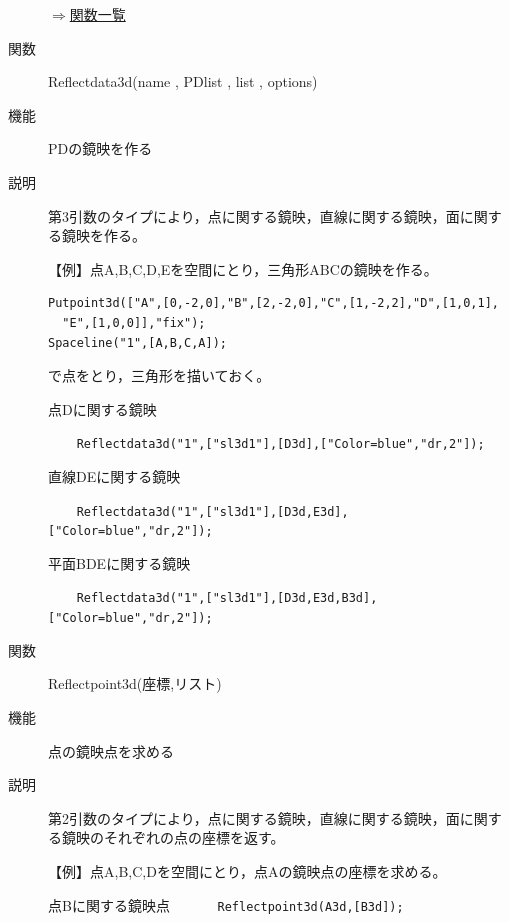 \documentclass[papersize,a4paper,12pt,uplatex]{jsarticle}
\begin{document}
\begin{description}
\begin{flushright} \hyperlink{functionlist}{$\Rightarrow$関数一覧}\end{flushright}

\hypertarget{reflectdata3d}{}
\item[関数]  Reflectdata3d(name , PDlist , list , options)
\item[機能]  PDの鏡映を作る
\item[説明]  第3引数のタイプにより，点に関する鏡映，直線に関する鏡映，面に関する鏡映を作る。

\vspace{\baselineskip}
【例】点A,B,C,D,Eを空間にとり，三角形ABCの鏡映を作る。

\begin{verbatim}
Putpoint3d(["A",[0,-2,0],"B",[2,-2,0],"C",[1,-2,2],"D",[1,0,1],
  "E",[1,0,0]],"fix");
Spaceline("1",[A,B,C,A]);
\end{verbatim}

で点をとり，三角形を描いておく。

点Dに関する鏡映

 \verb|    Reflectdata3d("1",["sl3d1"],[D3d],["Color=blue","dr,2"]);|

\hspace{20mm} 

直線DEに関する鏡映 

 \verb|    Reflectdata3d("1",["sl3d1"],[D3d,E3d],["Color=blue","dr,2"]);|

\hspace{20mm} 

平面BDEに関する鏡映

\verb|    Reflectdata3d("1",["sl3d1"],[D3d,E3d,B3d],["Color=blue","dr,2"]);|

\hspace{20mm} 
 

\vspace{\baselineskip}
\hypertarget{reflectpoint3d}{}
\item[関数]  Reflectpoint3d(座標,リスト)
\item[機能]  点の鏡映点を求める
\item[説明]  第2引数のタイプにより，点に関する鏡映，直線に関する鏡映，面に関する鏡映のそれぞれの点の座標を返す。

\vspace{\baselineskip}
【例】点A,B,C,Dを空間にとり，点Aの鏡映点の座標を求める。

点Bに関する鏡映点      \verb|      Reflectpoint3d(A3d,[B3d]);|
    

\end{description}
\end{document}
